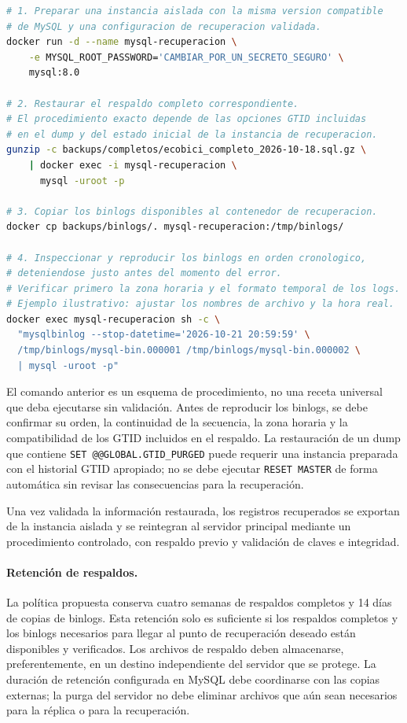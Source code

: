 \documentclass[10pt,a4paper]{article}
\begin{document}
\begin{lstlisting}[language=bash, caption={Esquema de recuperación a un punto en el tiempo}]
# 1. Preparar una instancia aislada con la misma version compatible
# de MySQL y una configuracion de recuperacion validada.
docker run -d --name mysql-recuperacion \
    -e MYSQL_ROOT_PASSWORD='CAMBIAR_POR_UN_SECRETO_SEGURO' \
    mysql:8.0

# 2. Restaurar el respaldo completo correspondiente.
# El procedimiento exacto depende de las opciones GTID incluidas
# en el dump y del estado inicial de la instancia de recuperacion.
gunzip -c backups/completos/ecobici_completo_2026-10-18.sql.gz \
    | docker exec -i mysql-recuperacion \
      mysql -uroot -p

# 3. Copiar los binlogs disponibles al contenedor de recuperacion.
docker cp backups/binlogs/. mysql-recuperacion:/tmp/binlogs/

# 4. Inspeccionar y reproducir los binlogs en orden cronologico,
# deteniendose justo antes del momento del error.
# Verificar primero la zona horaria y el formato temporal de los logs.
# Ejemplo ilustrativo: ajustar los nombres de archivo y la hora real.
docker exec mysql-recuperacion sh -c \
  "mysqlbinlog --stop-datetime='2026-10-21 20:59:59' \
  /tmp/binlogs/mysql-bin.000001 /tmp/binlogs/mysql-bin.000002 \
  | mysql -uroot -p"
\end{lstlisting}

El comando anterior es un esquema de procedimiento, no una receta universal que deba ejecutarse sin validación. Antes de reproducir los binlogs, se debe confirmar su orden, la continuidad de la secuencia, la zona horaria y la compatibilidad de los GTID incluidos en el respaldo. La restauración de un dump que contiene \texttt{SET @@GLOBAL.GTID\_PURGED} puede requerir una instancia preparada con el historial GTID apropiado; no se debe ejecutar \texttt{RESET MASTER} de forma automática sin revisar las consecuencias para la recuperación.

Una vez validada la información restaurada, los registros recuperados se exportan de la instancia aislada y se reintegran al servidor principal mediante un procedimiento controlado, con respaldo previo y validación de claves e integridad.

\paragraph{Retención de respaldos.}
La política propuesta conserva cuatro semanas de respaldos completos y 14 días de copias de binlogs. Esta retención solo es suficiente si los respaldos completos y los binlogs necesarios para llegar al punto de recuperación deseado están disponibles y verificados. Los archivos de respaldo deben almacenarse, preferentemente, en un destino independiente del servidor que se protege. La duración de retención configurada en MySQL debe coordinarse con las copias externas; la purga del servidor no debe eliminar archivos que aún sean necesarios para la réplica o para la recuperación.
\end{document}
